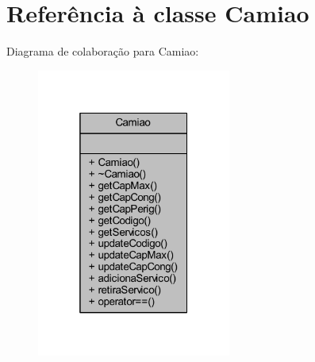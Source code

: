 \hypertarget{class_camiao}{}\section{Referência à classe Camiao}
\label{class_camiao}


Diagrama de colaboração para Camiao\+:
\nopagebreak
\begin{figure}[H]
\begin{center}
\leavevmode
\includegraphics[width=181pt]{class_camiao__coll__graph}
\end{center}
\end{figure}
